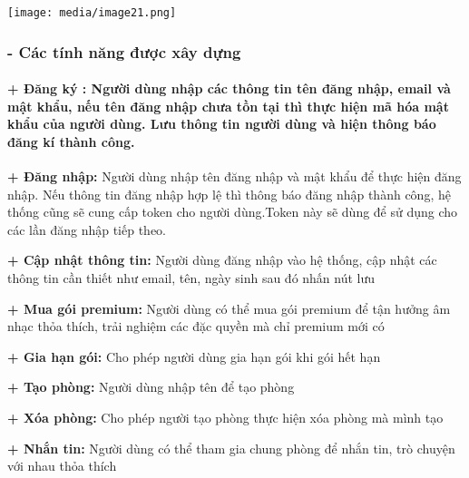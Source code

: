 \documentclass{article}
\begin{document}
\texttt{[image: media/image21.png]}

\subsubsection{\texorpdfstring{\textbf{- Các tính năng được xây
dựng}}{- Các tính năng được xây dựng}}\label{cuxe1c-tuxednh-nux103ng-ux111ux1b0ux1ee3c-xuxe2y-dux1ef1ng}

\paragraph{\texorpdfstring{\textbf{+ Đăng ký :} Người dùng nhập các
thông tin tên đăng nhập, email và mật khẩu, nếu tên đăng nhập chưa tồn
tại thì thực hiện mã hóa mật khẩu của người dùng. Lưu thông tin người
dùng và hiện thông báo đăng kí thành
công.}{+ Đăng ký : Người dùng nhập các thông tin tên đăng nhập, email và mật khẩu, nếu tên đăng nhập chưa tồn tại thì thực hiện mã hóa mật khẩu của người dùng. Lưu thông tin người dùng và hiện thông báo đăng kí thành công.}}\label{ux111ux103ng-kuxfd-ngux1b0ux1eddi-duxf9ng-nhux1eadp-cuxe1c-thuxf4ng-tin-tuxean-ux111ux103ng-nhux1eadp-email-vuxe0-mux1eadt-khux1ea9u-nux1ebfu-tuxean-ux111ux103ng-nhux1eadp-chux1b0a-tux1ed3n-tux1ea1i-thuxec-thux1ef1c-hiux1ec7n-muxe3-huxf3a-mux1eadt-khux1ea9u-cux1ee7a-ngux1b0ux1eddi-duxf9ng.-lux1b0u-thuxf4ng-tin-ngux1b0ux1eddi-duxf9ng-vuxe0-hiux1ec7n-thuxf4ng-buxe1o-ux111ux103ng-kuxed-thuxe0nh-cuxf4ng.}

\textbf{+ Đăng nhập:} Người dùng nhập tên đăng nhập và mật khẩu để thực
hiện đăng nhập. Nếu thông tin đăng nhập hợp lệ thì thông báo đăng nhập
thành công, hệ thống cũng sẽ cung cấp token cho người dùng.Token này sẽ
dùng để sử dụng cho các lần đăng nhập tiếp theo.

\textbf{+ Cập nhật thông tin:} Người dùng đăng nhập vào hệ thống, cập
nhật các thông tin cần thiết như email, tên, ngày sinh sau đó nhấn nút
lưu

\textbf{+ Mua gói premium:} Người dùng có thể mua gói premium để tận
hưởng âm nhạc thỏa thích, trải nghiệm các đặc quyền mà chỉ premium mới
có

\textbf{+ Gia hạn gói:} Cho phép người dùng gia hạn gói khi gói hết hạn

\textbf{+ Tạo phòng:} Người dùng nhập tên để tạo phòng

\textbf{+ Xóa phòng:} Cho phép người tạo phòng thực hiện xóa phòng mà
mình tạo

\textbf{+ Nhắn tin:} Người dùng có thể tham gia chung phòng để nhắn tin,
trò chuyện với nhau thỏa thích
\end{document}
